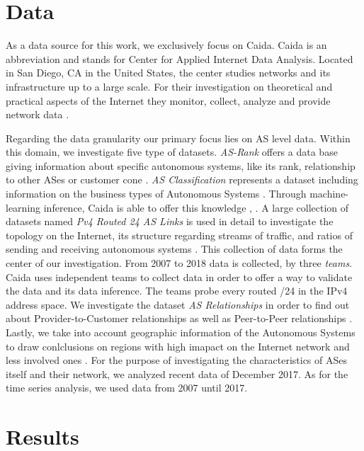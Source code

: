 \documentclass[conference, 11pt]{IEEEtran}
\begin{document}
\section{Data}
As a data source for this work, we exclusively focus on Caida. Caida is an abbreviation and stands for Center for Applied Internet Data Analysis. Located in San Diego, CA in the United States, the center studies networks and its infrastructure up to a large scale. For their investigation on theoretical and practical aspects of the Internet they monitor, collect, analyze and provide network data \cite{Caida}. \\  \linebreak

Regarding the data granularity our primary focus lies on AS level data. Within this domain, we investigate five type of datasets. \textit{AS-Rank} offers a data base giving information about specific autonomous systems, like its rank, relationship to other ASes or customer cone  \cite{Rank} . \textit{AS Classification} represents a dataset including information on the business types of Autonomous Systems \cite{Classification}. Through machine-learning inference, Caida is able to offer this knowledge  \cite{Classification}, \cite{dataInference}. A large collection of datasets named \textit{Pv4 Routed 24 AS Links} is used in detail to investigate the topology on the Internet, its structure regarding streams of traffic, and ratios of sending and receiving autonomous systems  \cite{IPv4Data}. This collection of data forms the center of our investigation. From 2007 to 2018 data is collected, by three \textit{teams}. Caida uses independent teams to collect data in order to offer a way to validate the data and its data inference. The teams probe every routed /24 in the IPv4 address space.
We investigate the dataset \textit{AS Relationships} in order to find out about Provider-to-Customer relationships as well as Peer-to-Peer relationships \cite{CaidaRelationshipsData}.  Lastly, we take into account geographic information of the Autonomous Systems to draw conlclusions on regions with high imapact on the Internet network and less involved ones  \cite{CaidaGeoData}. For the purpose of investigating the characteristics of ASes itself and their network, we analyzed recent data of December 2017.  As for the time series analysis, we used data from 2007 until 2017. \\


\section{Results}
\end{document}
